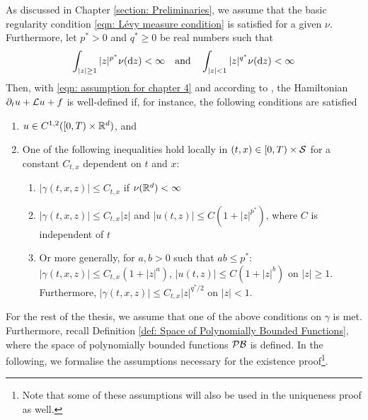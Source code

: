 As discussed in Chapter \ref{section: Preliminaries}, we assume that the basic regularity condition \eqref{eqn: Lévy measure condition} is satisfied for a given $\nu$. Furthermore, let $p^*>0$ and $q^*\geq 0$ be real numbers such that 
\begin{equation}
    \int_{|z|\geq 1} |z|^{p^*} \nu(\mathrm{d} z) < \infty \quad \text{and} \quad \int_{|z|<1}|z|^{q^*}\nu(\mathrm{d} z) < \infty
    \label{eqn: assumption for chapter 4}
\end{equation}
Then, with \eqref{eqn: assumption for chapter 4} and according to \cite{seydel2010generalexistenceuniquenessviscosity}, the Hamiltonian $\partial_t u + \mathcal{L} u + f$ is well-defined if, for instance, the following conditions are satisfied
\begin{enumerate}
    \item $u \in C^{1,2}([0,T) \times \mathbb{R}^d)$, and
    \item One of the following inequalities hold locally in $(t,x) \in [0,T) \times \mathcal{S}$ for a constant $C_{t,x}$ dependent on $t$ and $x$:
    \begin{enumerate}[label=(\alph*)]
        \item $|\gamma(t,x,z)| \leq C_{t,x}$ if $\nu(\mathbb{R}^d) < \infty$
        \item $|\gamma(t,x,z)| \leq C_{t,x}|z|$ and $|u(t,z)| \leq C(1+|z|^{p^*})$, where $C$ is independent of $t$
        \item Or more generally, for $a,b>0$ such that $ab \leq p^*$: $|\gamma(t,x,z)| \leq C_{t,x}(1+|z|^a)$, $|u(t,z)| \leq C(1+|z|^b)$ on $|z|\geq1$. Furthermore, $|\gamma(t,x,z)| \leq C_{t,x} |z|^{q^*/2}$ on $|z|<1$. 
    \end{enumerate}
\end{enumerate}
For the rest of the thesis, we assume that one of the above conditions on $\gamma$ is met. Furthermore, recall Definition \ref{def: Space of Polynomially Bounded Functions}, where the space of polynomially bounded functions $\mathcal{PB}$ is defined. In the following, we formalise the assumptions necessary for the existence proof\footnote{Note that some of these assumptions will also be used in the uniqueness proof as well.}.

